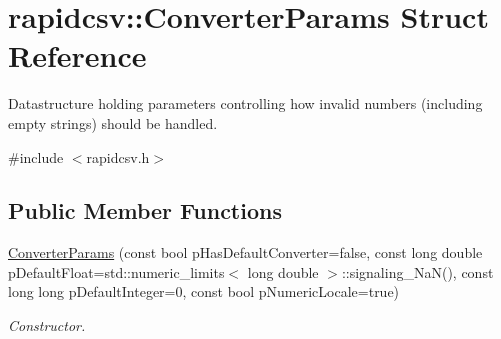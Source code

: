 \hypertarget{structrapidcsv_1_1ConverterParams}{}\section{rapidcsv\+:\+:Converter\+Params Struct Reference}
\label{structrapidcsv_1_1ConverterParams}


Datastructure holding parameters controlling how invalid numbers (including empty strings) should be handled.  




{\ttfamily \#include $<$rapidcsv.\+h$>$}

\subsection*{Public Member Functions}
\begin{DoxyCompactItemize}
\item 
\hyperlink{structrapidcsv_1_1ConverterParams_a9ce85a6fd120b3ecb08c29e2727cd52e}{Converter\+Params} (const bool p\+Has\+Default\+Converter=false, const long double p\+Default\+Float=std\+::numeric\+\_\+limits$<$ long double $>$\+::signaling\+\_\+\+NaN(), const long long p\+Default\+Integer=0, const bool p\+Numeric\+Locale=true)
\begin{DoxyCompactList}\small\item\em Constructor. \end{DoxyCompactList}\end{DoxyCompactItemize}
